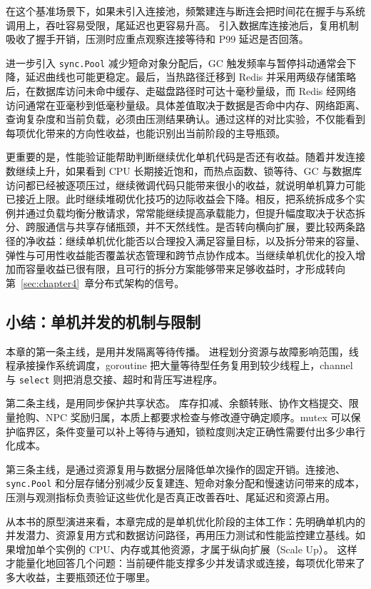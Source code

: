 在这个基准场景下，如果未引入连接池，频繁建连与断连会把时间花在握手与系统调用上，吞吐容易受限，尾延迟也更容易升高。
引入数据库连接池后，复用机制吸收了握手开销，压测时应重点观察连接等待和 P99 延迟是否回落。

进一步引入 \texttt{sync.Pool} 减少短命对象分配后，GC 触发频率与暂停抖动通常会下降，延迟曲线也可能更稳定。最后，当热路径迁移到 Redis 并采用两级存储策略后，在数据库访问未命中缓存、走磁盘路径时可达十毫秒量级，而 Redis 经网络访问通常在亚毫秒到低毫秒量级。具体差值取决于数据是否命中内存、网络距离、查询复杂度和当前负载，必须由压测结果确认。通过这样的对比实验，不仅能看到每项优化带来的方向性收益，也能识别出当前阶段的主导瓶颈。

更重要的是，性能验证能帮助判断继续优化单机代码是否还有收益。随着并发连接数继续上升，如果看到 CPU 长期接近饱和，而热点函数、锁等待、GC 与数据库访问都已经被逐项压过，继续微调代码只能带来很小的收益，就说明单机算力可能已接近上限。此时继续堆砌优化技巧的边际收益会下降。相反，把系统拆成多个实例并通过负载均衡分散请求，常常能继续提高承载能力，但提升幅度取决于状态拆分、跨服通信与共享存储瓶颈，并不天然线性。是否转向横向扩展，要比较两条路径的净收益：继续单机优化能否以合理投入满足容量目标，以及拆分带来的容量、弹性与可用性收益能否覆盖状态管理和跨节点协作成本。当继续单机优化的投入增加而容量收益已很有限，且可行的拆分方案能够带来足够收益时，才形成转向第~\ref{sec:chapter4}~章分布式架构的信号。


\subsection{小结：单机并发的机制与限制}\label{sec3:summary}

本章的第一条主线，是用并发隔离等待传播。
进程划分资源与故障影响范围，线程承接操作系统调度，goroutine 把大量等待型任务复用到较少线程上，channel 与 \texttt{select} 则把消息交接、超时和背压写进程序。

第二条主线，是用同步保护共享状态。
库存扣减、余额转账、协作文档提交、限量抢购、NPC 奖励归属，本质上都要求检查与修改遵守确定顺序。mutex 可以保护临界区，条件变量可以补上等待与通知，锁粒度则决定正确性需要付出多少串行化成本。

第三条主线，是通过资源复用与数据分层降低单次操作的固定开销。连接池、\texttt{sync.Pool} 和分层存储分别减少反复建连、短命对象分配和慢速访问带来的成本，压测与观测指标负责验证这些优化是否真正改善吞吐、尾延迟和资源占用。

从本书的原型演进来看，本章完成的是单机优化阶段的主体工作：先明确单机内的并发潜力、资源复用方式和数据访问路径，再用压力测试和性能监控建立基线。如果增加单个实例的 CPU、内存或其他资源，才属于纵向扩展（Scale Up）。
这样才能量化地回答几个问题：当前硬件能支撑多少并发请求或连接，每项优化带来了多大收益，主要瓶颈还位于哪里。

